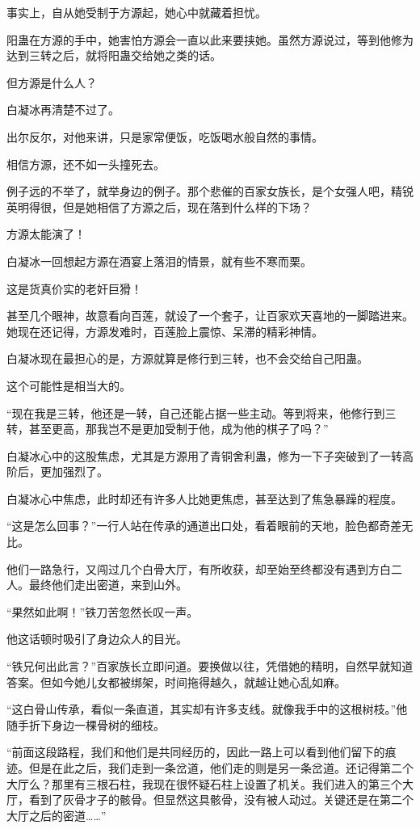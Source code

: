 \begin{this_body}
事实上，自从她受制于方源起，她心中就藏着担忧。

阳蛊在方源的手中，她害怕方源会一直以此来要挟她。虽然方源说过，等到他修为达到三转之后，就将阳蛊交给她之类的话。

但方源是什么人？

白凝冰再清楚不过了。

出尔反尔，对他来讲，只是家常便饭，吃饭喝水般自然的事情。

相信方源，还不如一头撞死去。

例子远的不举了，就举身边的例子。那个悲催的百家女族长，是个女强人吧，精锐英明得很，但是她相信了方源之后，现在落到什么样的下场？

方源太能演了！

白凝冰一回想起方源在酒宴上落泪的情景，就有些不寒而栗。

这是货真价实的老奸巨猾！

甚至几个眼神，故意看向百莲，就设了一个套子，让百家欢天喜地的一脚踏进来。她现在还记得，方源发难时，百莲脸上震惊、呆滞的精彩神情。

白凝冰现在最担心的是，方源就算是修行到三转，也不会交给自己阳蛊。

这个可能性是相当大的。

“现在我是三转，他还是一转，自己还能占据一些主动。等到将来，他修行到三转，甚至更高，那我岂不是更加受制于他，成为他的棋子了吗？”

白凝冰心中的这股焦虑，尤其是方源用了青铜舍利蛊，修为一下子突破到了一转高阶后，更加强烈了。

白凝冰心中焦虑，此时却还有许多人比她更焦虑，甚至达到了焦急暴躁的程度。

“这是怎么回事？”一行人站在传承的通道出口处，看着眼前的天地，脸色都奇差无比。

他们一路急行，又闯过几个白骨大厅，有所收获，却至始至终都没有遇到方白二人。最终他们走出密道，来到山外。

“果然如此啊！”铁刀苦忽然长叹一声。

他这话顿时吸引了身边众人的目光。

“铁兄何出此言？”百家族长立即问道。要换做以往，凭借她的精明，自然早就知道答案。但如今她儿女都被绑架，时间拖得越久，就越让她心乱如麻。

“这白骨山传承，看似一条直道，其实却有许多支线。就像我手中的这根树枝。”他随手折下身边一棵骨树的细枝。

“前面这段路程，我们和他们是共同经历的，因此一路上可以看到他们留下的痕迹。但是在此之后，我们走到一条岔道，他们走的则是另一条岔道。还记得第二个大厅么？那里有三根石柱，我现在很怀疑石柱上设置了机关。我们进入的第三个大厅，看到了灰骨才子的骸骨。但显然这具骸骨，没有被人动过。关键还是在第二个大厅之后的密道……”


\end{this_body}
